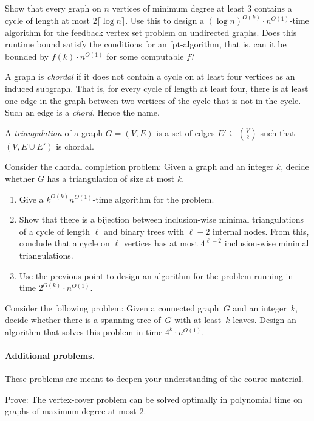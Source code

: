 \documentclass{uebung_cs}
\begin{document}
  \begin{exercise}
  Show that every graph on $n$ vertices of minimum degree at least $3$ contains a cycle of length at most $2\lceil \log n\rceil$.
  Use this to design a $(\log n)^{O(k)} \cdot  n^{O(1)}$-time algorithm for the feedback vertex set problem on undirected graphs.
  Does this runtime bound satisfy the conditions for an fpt-algorithm, that is, can it be bounded by $f(k) \cdot n^{O(1)}$ for some computable $f$?
  \end{exercise}
  
  \begin{exercise}
  A graph is \emph{chordal} if it does not contain a cycle on at least four vertices as an induced subgraph.
  That is, for every cycle of length at least four, 
  there is at least one edge in the graph between two vertices of the cycle that is not in the cycle. 
  Such an edge is a \emph{chord}. Hence the name.
  
  A \emph{triangulation} of a graph $G=(V,E)$ is a set of edges $E' \subseteq \binom{V}{2}$ such that $(V,E\cup E')$ is chordal.
  
  Consider the chordal completion problem: Given a graph and an integer $k$, decide whether $G$ has a triangulation of size at most $k$. 
  \begin{enumerate}
  \item Give a $k^{O(k)} n^{O(1)}$-time algorithm for the problem.
  \item Show that there is a bijection between inclusion-wise minimal triangulations of a cycle of length $\ell$ and binary trees with $\ell-2$ internal nodes. From this, conclude that a cycle on $\ell$ vertices has at most $4^{\ell-2}$ inclusion-wise minimal triangulations.
  \item Use the previous point to design an algorithm for the problem running in time $2^{O(k)} \cdot n^{O(1)}$.
  \end{enumerate}
  \end{exercise}
  
  \begin{exercise}
  Consider the following problem: Given a connected graph~$G$ and an integer~$k$, decide whether there is a spanning tree of~$G$ with at least~$k$ leaves. Design an algorithm that solves this problem in time $4^k \cdot n^{O(1)}$.
  \end{exercise}

  \sepline

  \paragraph{Additional problems.}
  These problems are meant to deepen your understanding of the course material.

  \begin{exercise}
    Prove: The vertex-cover problem can be solved optimally in polynomial time on graphs of maximum degree at most $2$.
    \end{exercise}
    

    
\end{document}
